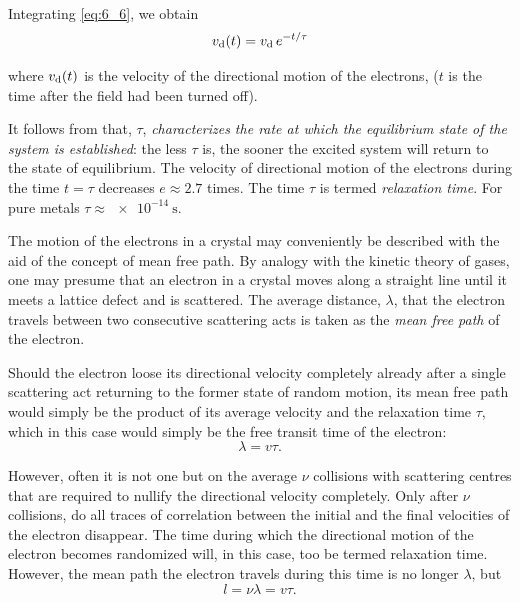 \noindent
Integrating \eqref{eq:6_6}, we obtain
\begin{equation}\label{eq:6_7}
    v_{\text{d}}(t) = v_{\text{d}}\, e^{-t/\tau}
\end{equation}

\noindent
where $v_{\text{d}}(t)$ is the velocity of the directional motion of the electrons, ($t$ is the time after the field had been turned off).

It follows from  that, $\tau$, \textit{characterizes the rate at which the equilibrium state of the system is established}: the less $\tau$ is, the sooner the excited system will return to the state of equilibrium. The velocity of directional motion of the electrons during the time $t=\tau$ decreases $e\approx 2.7$ times. The time $\tau$ is termed \textit{relaxation time}. For pure metals $\tau\approx\SI{e-14}{\second}$.

The motion of the electrons in a crystal may conveniently be described with the aid of the concept of mean free path. By analogy with the kinetic theory of gases, one may presume that an electron in a crystal moves along a straight line until it meets a lattice defect and is scattered. The average distance, $\lambda$, that the electron travels between two consecutive scattering acts is taken as the \textit{mean free path} of the electron.

Should the electron loose its directional velocity completely already after a single scattering act returning to the former state of random motion, its mean free path would simply be the product of its average velocity and the relaxation time $\tau$, which in this case would simply be the free transit time of the electron:
\begin{equation}\label{eq:6_8}
    \lambda = v \tau.
\end{equation}

However, often it is not one but on the average $\nu$ collisions with scattering centres that are required to nullify the directional velocity completely. Only after $\nu$ collisions, do all traces of correlation between the initial and the final velocities of the electron disappear. The time during which the directional motion of the electron becomes randomized will, in this case, too be termed relaxation time. However, the mean path the electron travels during this time is no longer $\lambda$, but
\begin{equation}\label{eq:6_9}
    l = \nu \lambda = v \tau.
\end{equation}


